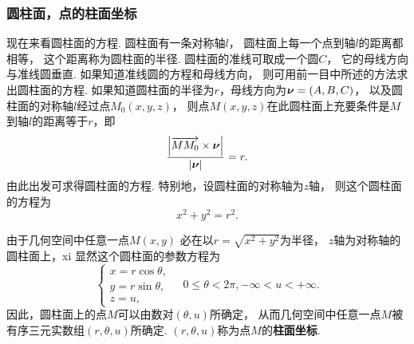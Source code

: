 \subsubsection{圆柱面，点的柱面坐标}
现在来看圆柱面的方程.
圆柱面有一条对称轴\(l\)，
圆柱面上每一个点到轴\(l\)的距离都相等，
这个距离称为圆柱面的半径.
圆柱面的准线可取成一个圆\(C\)，
它的母线方向与准线圆垂直.
如果知道准线圆的方程和母线方向，
则可用前一目中所述的方法求出圆柱面的方程.
如果知道圆柱面的半径为\(r\)，母线方向为\(\boldsymbol{\nu}=(A,B,C)\)，
以及圆柱面的对称轴\(l\)经过点\(M_0(x,y,z)\)，
则点\(M(x,y,z)\)在此圆柱面上充要条件是\(M\)到轴\(l\)的距离等于\(r\)，即\[
	\frac{\abs{\overrightarrow{M M_0} \times \boldsymbol{\nu}}}{\abs{\boldsymbol{\nu}}} = r.
\]
由此出发可求得圆柱面的方程.
特别地，设圆柱面的对称轴为\(z\)轴，
则这个圆柱面的方程为
\begin{equation}\label{equation:解析几何.以z轴为对称轴r为半径的圆柱面的一般方程}
	x^2+y^2=r^2.
\end{equation}

由于几何空间中任意一点\(M(x,y)\)
必在以\(r=\sqrt{x^2+y^2}\)为半径，
\(z\)轴为对称轴的圆柱面上，xi
显然这个圆柱面的参数方程为\[
	\left\{ \begin{array}{l}
		x = r \cos\theta, \\
		y = r \sin\theta, \\
		z = u,
	\end{array} \right.
	\quad 0\leqslant \theta < 2\pi,
	-\infty < u < +\infty.
\]
因此，圆柱面上的点\(M\)可以由数对\((\theta,u)\)所确定，
从而几何空间中任意一点\(M\)被有序三元实数组\((r,\theta,u)\)所确定.
\((r,\theta,u)\)称为点\(M\)的\textbf{柱面坐标}.

